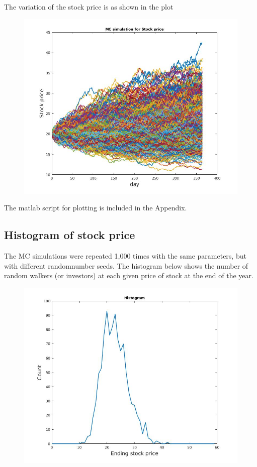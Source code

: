 \documentclass[11pt, oneside]{article}   	%
\begin{document}
The variation of the stock price is as shown in the plot
	\begin{figure}[!htbp]
	\centering
	\includegraphics[scale=1]{stockPricePlot.jpg}
	\end{figure}
The matlab script for plotting is included in the Appendix.

\subsection{Histogram of stock price}
The MC simulations were repeated 1,000 times with the same parameters, but with different randomnumber seeds. The histogram below shows the number of random walkers (or investors) at each given price of stock at the end of the year.
	\begin{figure}[!htbp]
	\centering
	\includegraphics[scale=1]{stockHistogram.jpg}
	\end{figure}
\end{document}
